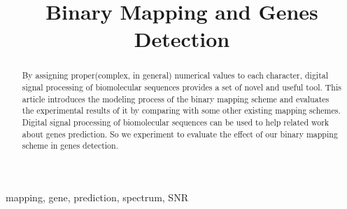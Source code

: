\documentclass[conference]{IEEEtran}
\begin{document}
\title{Binary Mapping and Genes Detection}

\author{
\and
{} 
\and
{}
}

\maketitle

\begin{abstract}
By assigning proper(complex, in general) numerical values to each character, digital signal processing of biomolecular sequences provides a set of novel and useful tool. This article introduces the modeling process of the binary mapping scheme and evaluates the experimental results of it by comparing with some other existing mapping schemes. Digital signal processing of biomolecular sequences can be used to help related work about genes prediction. So we experiment to evaluate the effect of our binary mapping scheme in genes detection.
\end{abstract}

\begin{IEEEkeywords}
mapping, gene, prediction, spectrum, SNR
\end{IEEEkeywords}
\end{document}
